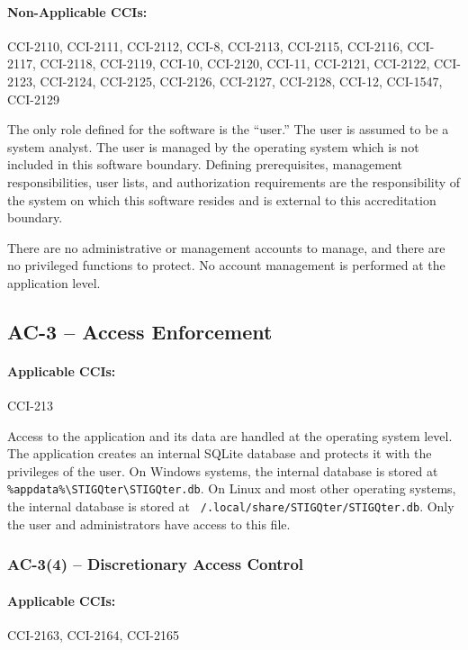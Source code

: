 \documentclass[letterpaper, 10pt, twoside]{article}
\begin{document}
\paragraph{Non-Applicable CCIs:} CCI-2110, CCI-2111, CCI-2112, CCI-8, CCI-2113, CCI-2115, CCI-2116, CCI-2117, CCI-2118, CCI-2119, CCI-10, CCI-2120, CCI-11, CCI-2121, CCI-2122, CCI-2123, CCI-2124, CCI-2125, CCI-2126, CCI-2127, CCI-2128, CCI-12, CCI-1547, CCI-2129

The only role defined for the software is the ``user.'' The user is assumed to be a system analyst. The user is managed by the operating system which is not included in this software boundary. Defining prerequisites, management responsibilities, user lists, and authorization requirements are the responsibility of the system on which this software resides and is external to this accreditation boundary.

There are no administrative or management accounts to manage, and there are no privileged functions to protect. No account management is performed at the application level.

\subsection{AC-3 -- Access Enforcement}
\label{sec:ac-3}

\paragraph{Applicable CCIs:} CCI-213

Access to the application and its data are handled at the operating system level. The application creates an internal SQLite database and protects it with the privileges of the user. On Windows systems, the internal database is stored at \texttt{\%appdata\%\textbackslash\allowbreak STIGQter\textbackslash\allowbreak STIGQter.db}. On Linux and most other operating systems, the internal database is stored at \texttt{~/.local/\allowbreak share/\allowbreak STIGQter/\allowbreak STIGQter.db}. Only the user and administrators have access to this file.

\subsubsection{AC-3(4) -- Discretionary Access Control}

\paragraph{Applicable CCIs:} CCI-2163, CCI-2164, CCI-2165
\end{document}
